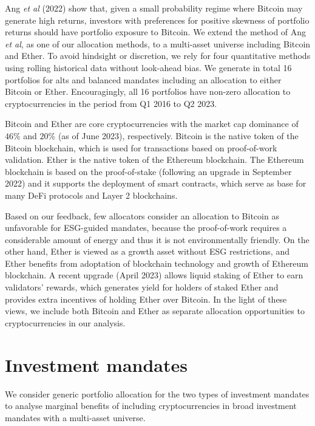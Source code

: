 \documentclass[pdftex,11pt,a4paper] {article}
\begin{document}
Ang \textit{et al} (2022) \cite{Ang2022} show that, given a small probability regime where Bitcoin may generate high returns, investors with preferences for positive skewness of portfolio returns should have portfolio exposure to Bitcoin. We extend the method of Ang \textit{et al}, as one of our allocation methods, to a multi-asset universe including Bitcoin and Ether. To avoid hindsight or discretion, we rely for four quantitative methods using rolling historical data without look-ahead bias. We generate in total 16 portfolios for alts and balanced mandates including an allocation to either Bitcoin or Ether. Encouragingly, all 16 portfolios have  non-zero allocation to cryptocurrencies in the period from Q1 2016 to Q2 2023.

Bitcoin and Ether are core cryptocurrencies with the market cap dominance of $46\%$ and $20\%$ (as of June 2023), respectively. Bitcoin is the native token of the Bitcoin blockchain, which is used for transactions based on proof-of-work validation. Ether is the native token of the Ethereum blockchain. The Ethereum blockchain is based on the proof-of-stake (following an upgrade in September 2022) and it supports the deployment of smart contracts, which serve as base for many DeFi protocols and Layer 2 blockchains.

Based on our feedback, few allocators consider an allocation to Bitcoin as unfavorable for ESG-guided mandates, because the proof-of-work requires a considerable amount of energy and thus it is not environmentally friendly. On the other hand, Ether is viewed as a growth asset without ESG restrictions, and Ether benefits from adoptation of blockchain technology and growth of Ethereum blockchain. A recent upgrade (April 2023) allows liquid staking of Ether to earn validators' rewards, which generates yield for holders of staked Ether and provides extra incentives of holding Ether over Bitcoin. In the light of these views, we include both Bitcoin and Ether as separate allocation opportunities to cryptocurrencies in our analysis.




\section{Investment mandates}

We consider generic portfolio allocation for the two types of investment mandates 
to analyse marginal benefits of including cryptocurrencies in broad investment mandates with a multi-asset universe.
\end{document}
